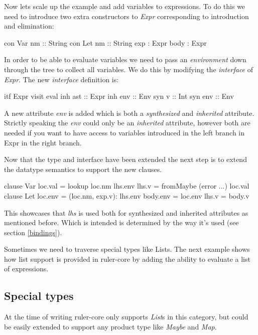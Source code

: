Now lets scale up the example and add variables to expressions. To do this we need to introduce two extra constructors to \emph{Expr} corresponding to introduction and elimination:

\begin{code}
  con Var
    nm      :: String
  con Let
    nm      :: String
    exp     :  Expr
    body    :  Expr
\end{code}

In order to be able to evaluate variables we need to pass an \emph{environment} down through the tree to collect all variables. We do this by modifying the \emph{interface} of \emph{Expr}. The new \emph{interface} definition is:

\begin{code}
itf Expr
  visit eval 
    inh ast :: Expr
    inh env :: Env
    syn v   :: Int
    syn env :: Env
\end{code}

A new attribute \emph{env} is added which is both a \emph{synthesized} and \emph{inherited} attribute. Strictly speaking the \emph{env} could only be an \emph{inherited} attribute, however both are needed if you want to have access to variables introduced in the left branch in Expr in the right branch.

Now that the type and interface have been extended the next step is to extend the datatype semantics to support the new clauses.

\begin{code}
   clause Var
     loc.val = lookup loc.nm lhs.env
     lhs.v   = fromMaybe (error ...) loc.val
   clause Let
     loc.env  = (loc.nm, exp.v): lhs.env
     body.env = loc.env
     lhs.v    = body.v
\end{code}

This showcases that \emph{lhs} is used both for synthesized and inherited attributes as mentioned before. Which is intended is determined by the way it's used (see section \ref{bindings}).

Sometimes we need to traverse special types like Lists. The next example shows how list support is provided in ruler-core by adding the ability to evaluate a list of expressions.

\subsection{Special types}
At the time of writing ruler-core only supports \emph{List}s in this category, but could be easily extended to support any product type like \emph{Maybe} and \emph{Map}.

